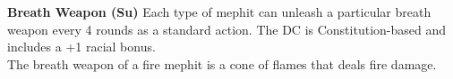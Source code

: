 \textbf{Breath Weapon (Su)}  Each type of mephit can unleash a particular breath weapon every 4 rounds as a standard action. The DC is Constitution-based and includes a +1 racial bonus. \\

The breath weapon of a fire mephit is a cone of flames that deals  \hspace{1pt} fire damage. \\

\newpage